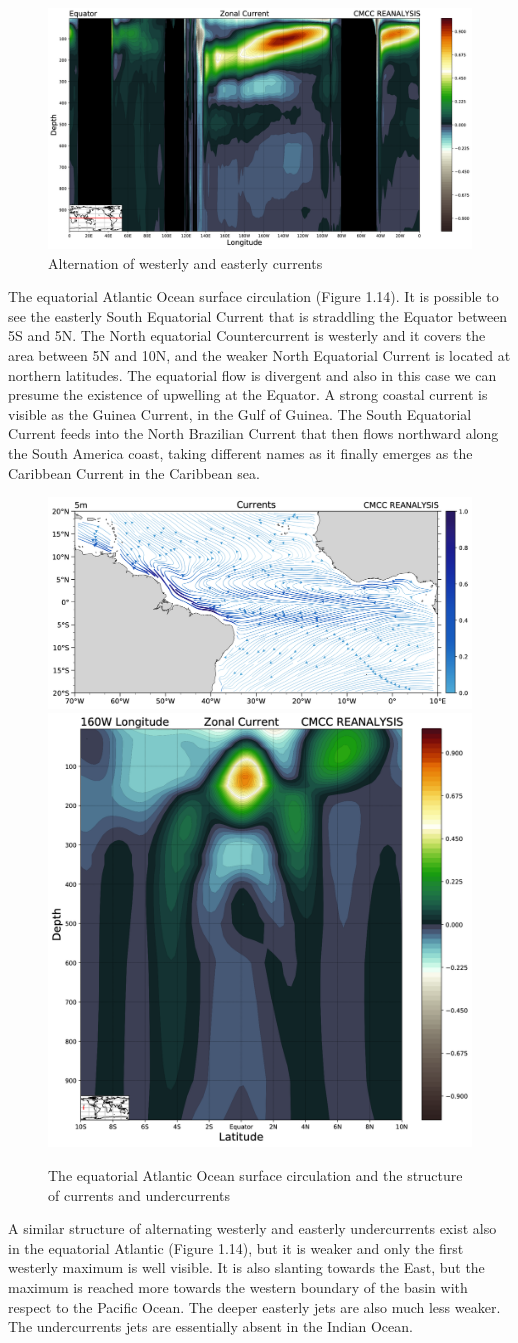 \begin{figure}[htpb]
	\centering
	\includegraphics[width = 0.4 \textwidth]{upload/40image.png}
	\caption{Alternation of westerly and easterly currents} \label{fig:fig16}
\end{figure}

The equatorial Atlantic Ocean surface circulation (Figure 1.14). It is possible to see the easterly South Equatorial
Current that is straddling the Equator between 5S and 5N. The North
equatorial Countercurrent is westerly and it covers the area between 5N
and 10N, and the weaker North Equatorial Current is located at northern
latitudes. The equatorial flow is divergent and also in this case we can
presume the existence of upwelling at the Equator. A strong coastal
current is visible as the Guinea Current, in the Gulf of Guinea. The
South Equatorial Current feeds into the North Brazilian Current that
then flows northward along the South America coast, taking different
names as it finally emerges as the Caribbean Current in the Caribbean
sea.
\begin{figure}[htpb!]
	\centering
	\includegraphics[width=0.45\linewidth]{upload/41image.png}\quad \includegraphics[width=0.3\linewidth]{upload/42.png}
	\caption{The equatorial Atlantic Ocean surface circulation and the structure of currents and undercurrents}
	\label{fig:fig17}
\end{figure}
A similar structure of alternating westerly and easterly undercurrents
exist also in the equatorial Atlantic (Figure 1.14), but it
is weaker and only the first westerly maximum is well visible. It is
also slanting towards the East, but the maximum is reached more towards
the western boundary of the basin with respect to the Pacific Ocean. The
deeper easterly jets are also much less weaker. The undercurrents jets
are essentially absent in the Indian Ocean.


